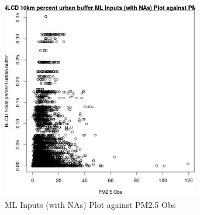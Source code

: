 \begin{figure} 
\centering  
\includegraphics[width=0.77\textwidth]{Code_Outputs/Report_ML_input_PM25_Step4_part_e_de_duplicated_aves_compiled_2019-05-18wNAs_NLCD_10km_percent_urban_buffervPM25_Obs.jpg} 
\caption{\label{fig:Report_ML_input_PM25_Step4_part_e_de_duplicated_aves_compiled_2019-05-18wNAsNLCD_10km_percent_urban_buffervPM25_Obs}ML Inputs (with NAs) Plot against PM2.5 Obs} 
\end{figure} 
 
